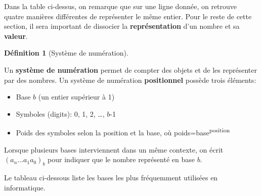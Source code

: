\documentclass[
  letterpaper,
]{scrbook}
\providecommand{\tightlist}{%
  \setlength{\itemsep}{0pt}\setlength{\parskip}{0pt}}\usepackage{longtable,booktabs,array}
\theoremstyle{definition}
\newtheorem{definition}{Définition}[chapter]
\theoremstyle{definition}
\theoremstyle{remark}
\begin{document}
Dans la table ci-dessus, on remarque que sur une ligne donnée, on
retrouve quatre manières différentes de représenter le même entier. Pour
le reste de cette section, il sera important de dissocier la
\textbf{représentation} d'un nombre et sa \textbf{valeur}.

\leavevmode{}%
\begin{definition}[Système de numération]\label{def-systeme-numeration}

Un \textbf{système de numération} permet de compter des objets et de les
représenter par des nombres. Un système de numération
\textbf{positionnel} possède trois éléments:

\begin{itemize}
\tightlist
\item
  Base \(b\) (un entier supérieur à 1)
\item
  Symboles (digits): 0, 1, 2, \ldots, \(b\)-1
\item
  Poids des symboles selon la position et la base, où
  poids=base\textsuperscript{position}
\end{itemize}

\end{definition}

\begin{tcolorbox}[enhanced jigsaw, arc=.35mm, breakable, rightrule=.15mm, left=2mm, colbacktitle=quarto-callout-note-color!10!white, colframe=quarto-callout-note-color-frame, coltitle=black, titlerule=0mm, leftrule=.75mm, toprule=.15mm, bottomtitle=1mm, opacityback=0, title=\textcolor{quarto-callout-note-color}{\faInfo}\hspace{0.5em}{Note}, toptitle=1mm, bottomrule=.15mm, opacitybacktitle=0.6, colback=white]

Lorsque plusieurs bases interviennent dans un même contexte, on écrit
\((a_n \ldots a_1a_0)_b\) pour indiquer que le nombre représenté en base
\(b\).

\end{tcolorbox}

Le tableau ci-dessous liste les bases les plus fréquemment utilisées en
informatique.
\end{document}
